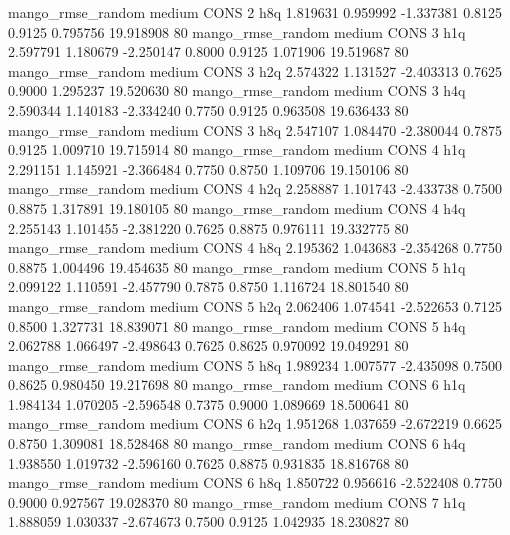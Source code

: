 mango_rmse_random     medium     CONS                 2                  h8q  1.819631 0.959992 -1.337381 0.8125 0.9125  0.795756   19.918908 80
mango_rmse_random     medium     CONS                 3                  h1q  2.597791 1.180679 -2.250147 0.8000 0.9125  1.071906   19.519687 80
mango_rmse_random     medium     CONS                 3                  h2q  2.574322 1.131527 -2.403313 0.7625 0.9000  1.295237   19.520630 80
mango_rmse_random     medium     CONS                 3                  h4q  2.590344 1.140183 -2.334240 0.7750 0.9125  0.963508   19.636433 80
mango_rmse_random     medium     CONS                 3                  h8q  2.547107 1.084470 -2.380044 0.7875 0.9125  1.009710   19.715914 80
mango_rmse_random     medium     CONS                 4                  h1q  2.291151 1.145921 -2.366484 0.7750 0.8750  1.109706   19.150106 80
mango_rmse_random     medium     CONS                 4                  h2q  2.258887 1.101743 -2.433738 0.7500 0.8875  1.317891   19.180105 80
mango_rmse_random     medium     CONS                 4                  h4q  2.255143 1.101455 -2.381220 0.7625 0.8875  0.976111   19.332775 80
mango_rmse_random     medium     CONS                 4                  h8q  2.195362 1.043683 -2.354268 0.7750 0.8875  1.004496   19.454635 80
mango_rmse_random     medium     CONS                 5                  h1q  2.099122 1.110591 -2.457790 0.7875 0.8750  1.116724   18.801540 80
mango_rmse_random     medium     CONS                 5                  h2q  2.062406 1.074541 -2.522653 0.7125 0.8500  1.327731   18.839071 80
mango_rmse_random     medium     CONS                 5                  h4q  2.062788 1.066497 -2.498643 0.7625 0.8625  0.970092   19.049291 80
mango_rmse_random     medium     CONS                 5                  h8q  1.989234 1.007577 -2.435098 0.7500 0.8625  0.980450   19.217698 80
mango_rmse_random     medium     CONS                 6                  h1q  1.984134 1.070205 -2.596548 0.7375 0.9000  1.089669   18.500641 80
mango_rmse_random     medium     CONS                 6                  h2q  1.951268 1.037659 -2.672219 0.6625 0.8750  1.309081   18.528468 80
mango_rmse_random     medium     CONS                 6                  h4q  1.938550 1.019732 -2.596160 0.7625 0.8875  0.931835   18.816768 80
mango_rmse_random     medium     CONS                 6                  h8q  1.850722 0.956616 -2.522408 0.7750 0.9000  0.927567   19.028370 80
mango_rmse_random     medium     CONS                 7                  h1q  1.888059 1.030337 -2.674673 0.7500 0.9125  1.042935   18.230827 80
